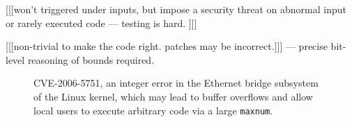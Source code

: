 [[[won't triggered under inputs, but impose a security threat
on abnormal input or rarely executed code --- testing is hard.
]]]

[[[non-trivial to make the code right. patches may be incorrect.]]]
--- precise bit-level reasoning of bounds required.

\begin{figure}

\caption{CVE-2006-5751, an integer error in the Ethernet bridge subsystem
of the Linux kernel, which may lead to buffer overflows and allow local users
to execute arbitrary code via a large \texttt{maxnum}.}
\label{f:bridge}
\end{figure}
